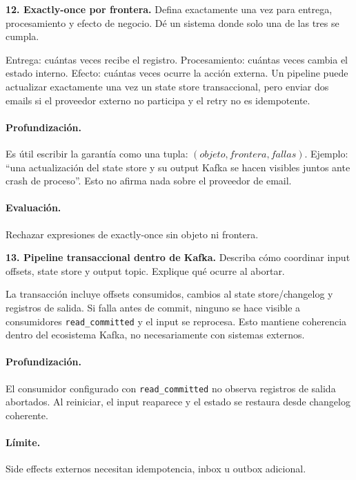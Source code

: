 \documentclass[variant=guiaresuelta,cover=institutional,mode=screen]{ua-engineering-v6-article}
\begin{document}
\begin{uaexercise}
\textbf{12. Exactly-once por frontera.} Defina exactamente una vez para entrega, procesamiento y efecto de negocio. Dé un sistema donde solo una de las tres se cumpla.
\end{uaexercise}
\begin{uaanswer}
Entrega: cuántas veces recibe el registro. Procesamiento: cuántas veces cambia el estado interno. Efecto: cuántas veces ocurre la acción externa. Un pipeline puede actualizar exactamente una vez un state store transaccional, pero enviar dos emails si el proveedor externo no participa y el retry no es idempotente.

\paragraph{Profundización.} Es útil escribir la garantía como una tupla: $(objeto, frontera, fallas)$. Ejemplo: ``una actualización del state store y su output Kafka se hacen visibles juntos ante crash de proceso''. Esto no afirma nada sobre el proveedor de email.\paragraph{Evaluación.} Rechazar expresiones de exactly-once sin objeto ni frontera.
\end{uaanswer}
\begin{uaexercise}
\textbf{13. Pipeline transaccional dentro de Kafka.} Describa cómo coordinar input offsets, state store y output topic. Explique qué ocurre al abortar.
\end{uaexercise}
\begin{uaanswer}
La transacción incluye offsets consumidos, cambios al state store/changelog y registros de salida. Si falla antes de commit, ninguno se hace visible a consumidores \texttt{read\_committed} y el input se reprocesa. Esto mantiene coherencia dentro del ecosistema Kafka, no necesariamente con sistemas externos.

\paragraph{Profundización.} El consumidor configurado con \texttt{read\_committed} no observa registros de salida abortados. Al reiniciar, el input reaparece y el estado se restaura desde changelog coherente.\paragraph{Límite.} Side effects externos necesitan idempotencia, inbox u outbox adicional.
\end{uaanswer}
\end{document}
